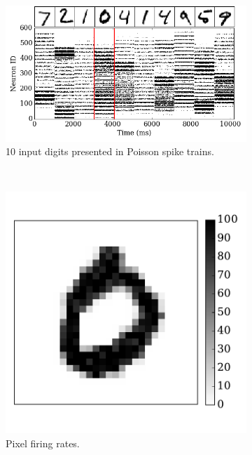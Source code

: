 		\begin{figure}[htbp!]
		\centering
		\begin{subfigure}[t]{0.65\textwidth}
			\includegraphics[width=\textwidth]{pics_iconip/6-1.png}
			\caption{10 input digits presented in Poisson spike trains.}
			\label{Fig:61}
		\end{subfigure}\\
		\begin{subfigure}[t]{0.3\textwidth}
			\includegraphics[width=\textwidth]{pics_iconip/6-2.pdf}
			\caption{Pixel firing rates.}
			\label{Fig:62}
		\end{subfigure}
		\begin{subfigure}[t]{0.3\textwidth}

\end{subfigure}
\end{figure}
